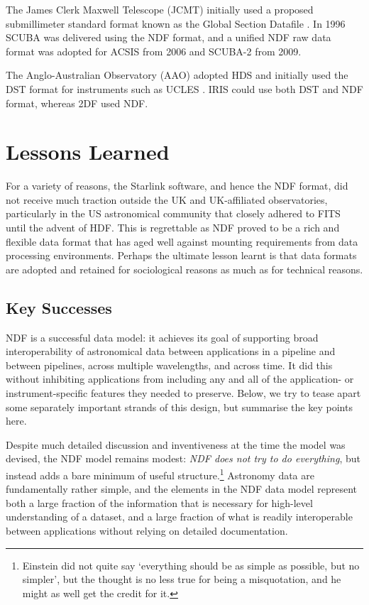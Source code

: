 \documentclass[final,authoryear,5p,times,twocolumn]{elsarticle}
\begin{document}
The James Clerk Maxwell Telescope (JCMT) initially used a proposed
submillimeter standard format known as the Global Section Datafile
\citep[GSD;][formerly General Single Dish Data]{sun229}. In 1996 SCUBA
\citep{1999MNRAS.303..659H} was delivered using the NDF format, and a
unified NDF raw data format was adopted for ACSIS
\citep{2009MNRAS.399.1026B} from 2006 and SCUBA-2
\citep{2013MNRAS.430.2513H} from 2009.

The Anglo-Australian Observatory (AAO) adopted HDS and initially used
the DST format for instruments such as UCLES
\citep{1990SPIE.1235..562D}. IRIS \citep{1993PASAu..10..298A} could
use both DST and NDF format, whereas 2DF \citep{2002MNRAS.333..279L}
used NDF.

\section{Lessons Learned}
\label{sec:lessons}

For a variety of reasons, the Starlink software, and hence the NDF
format, did not receive much traction outside the UK and UK-affiliated
observatories, particularly in
the US astronomical community that closely adhered to FITS until the
advent of HDF. This is regrettable as NDF proved to be a rich and
flexible data format that has aged well against mounting requirements
from data processing environments. Perhaps the ultimate lesson learnt
is that data formats are adopted and retained for sociological reasons
as much as for technical reasons.

\subsection{Key Successes}
\label{sec:success}

NDF is a successful data model: it achieves its goal of supporting
broad interoperability of astronomical data between applications in a
pipeline and between pipelines, across multiple wavelengths, and
across time.  It did this without inhibiting applications from
including any and all of the application- or instrument-specific
features they needed to preserve.  Below, we try to tease apart some
separately important strands of this design, but summarise the key
points here.

Despite much detailed discussion and inventiveness at the time the
model was devised, the NDF model remains modest: \emph{NDF does not
  try to do everything}, but instead adds a bare minimum of useful
structure.\footnote{Einstein did not quite say `everything should be
  as simple as possible, but no simpler', but the thought is no less
  true for being a misquotation, and he might as well get the credit
  for it.}  Astronomy data are fundamentally rather simple, and the
elements in the NDF data model represent both a large fraction of the
information that is necessary for high-level understanding of a
dataset, and a large fraction of what is readily interoperable between
applications without relying on detailed documentation.
\end{document}
